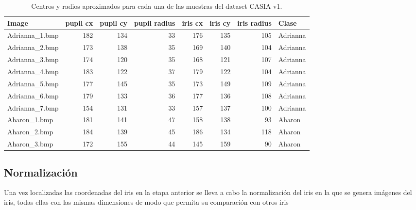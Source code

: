 \begin{table}[h]
    \centering
        \begin{tabular}{lrrrrrrl}
        \toprule
                  Image &  pupil cx &  pupil cy &  pupil radius &  iris cx &  iris cy &  iris radius &     Clase \\
        \midrule
         Adrianna\_1.bmp &             182 &             134 &            33 &            176 &            135 &          105 &  Adrianna \\
         Adrianna\_2.bmp &             173 &             138 &            35 &            169 &            140 &          104 &  Adrianna \\
         Adrianna\_3.bmp &             174 &             120 &            35 &            168 &            121 &          107 &  Adrianna \\
         Adrianna\_4.bmp &             183 &             122 &            37 &            179 &            122 &          104 &  Adrianna \\
         Adrianna\_5.bmp &             177 &             145 &            35 &            173 &            149 &          109 &  Adrianna \\
         Adrianna\_6.bmp &             179 &             133 &            36 &            177 &            136 &          108 &  Adrianna \\
         Adrianna\_7.bmp &             154 &             131 &            33 &            157 &            137 &          100 &  Adrianna \\
           Aharon\_1.bmp &             181 &             141 &            47 &            158 &            138 &           93 &    Aharon \\
           Aharon\_2.bmp &             184 &             139 &            45 &            186 &            134 &          118 &    Aharon \\
           Aharon\_3.bmp &             172 &             155 &            44 &            145 &            159 &           90 &    Aharon \\
        \bottomrule
        \end{tabular}
    \caption{Centros y radios aproximados para cada una de las muestras del dataset CASIA v1.}
    \label{tab:coords}
\end{table}


\subsection{Normalización}
Una vez localizadas las coordenadas del iris en la etapa anterior se lleva a cabo la normalización del iris en la que se genera imágenes del iris, todas ellas con las mismas dimensiones de modo que permita su comparación con otros iris ~\cite{daugman:1993,aksha:2019,alvarg:2020}

